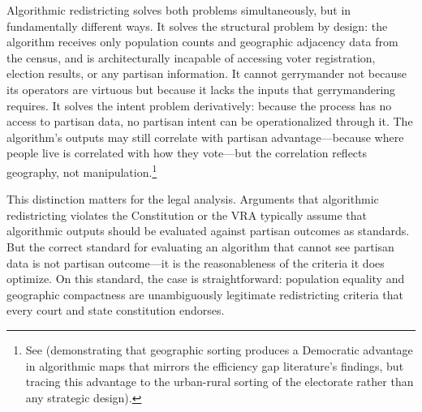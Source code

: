Algorithmic redistricting solves both problems simultaneously, but in fundamentally different ways. It solves the structural problem by design: the algorithm receives only population counts and geographic adjacency data from the census, and is architecturally incapable of accessing voter registration, election results, or any partisan information. It cannot gerrymander not because its operators are virtuous but because it lacks the inputs that gerrymandering requires. It solves the intent problem derivatively: because the process has no access to partisan data, no partisan intent can be operationalized through it. The algorithm's outputs may still correlate with partisan advantage---because where people live is correlated with how they vote---but the correlation reflects geography, not manipulation.\footnote{See \citet{dellaLibera2026recursive} (demonstrating that geographic sorting produces a Democratic advantage in algorithmic maps that mirrors the efficiency gap literature's findings, but tracing this advantage to the urban-rural sorting of the electorate rather than any strategic design).}

This distinction matters for the legal analysis. Arguments that algorithmic redistricting violates the Constitution or the VRA typically assume that algorithmic outputs should be evaluated against partisan outcomes as standards. But the correct standard for evaluating an algorithm that cannot see partisan data is not partisan outcome---it is the reasonableness of the criteria it does optimize. On this standard, the case is straightforward: population equality and geographic compactness are unambiguously legitimate redistricting criteria that every court and state constitution endorses.
